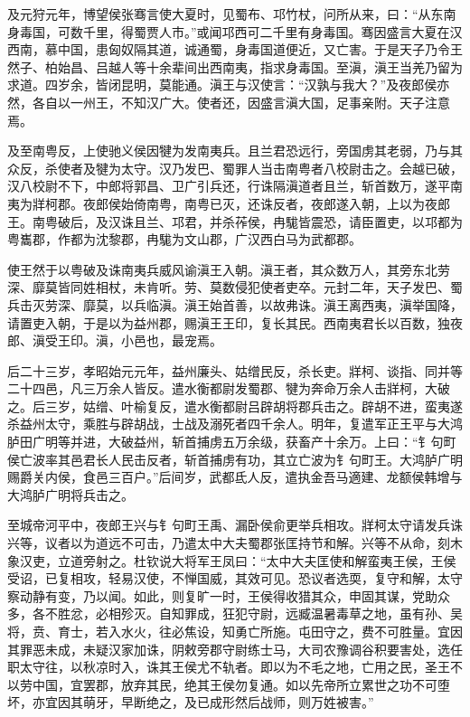 \documentclass[]{article}
\begin{document}
及元狩元年，博望侯张骞言使大夏时，见蜀布、邛竹杖，问所从来，曰：``从东南身毒国，可数千里，得蜀贾人市。''或闻邛西可二千里有身毒国。骞因盛言大夏在汉西南，慕中国，患匈奴隔其道，诚通蜀，身毒国道便近，又亡害。于是天子乃令王然子、柏始昌、吕越人等十余辈间出西南夷，指求身毒国。至滇，滇王当羌乃留为求道。四岁余，皆闭昆明，莫能通。滇王与汉使言：``汉孰与我大？''及夜郎侯亦然，各自以一州王，不知汉广大。使者还，因盛言滇大国，足事亲附。天子注意焉。

及至南粤反，上使驰义侯因犍为发南夷兵。且兰君恐远行，旁国虏其老弱，乃与其众反，杀使者及犍为太守。汉乃发巴、蜀罪人当击南粤者八校尉击之。会越已破，汉八校尉不下，中郎将郭昌、卫广引兵还，行诛隔滇道者且兰，斩首数万，遂平南夷为牂柯郡。夜郎侯始倚南粤，南粤已灭，还诛反者，夜郎遂入朝，上以为夜郎王。南粤破后，及汉诛且兰、邛君，并杀莋侯，冉駹皆震恐，请臣置吏，以邛都为粤巂郡，作都为沈黎郡，冉駹为文山郡，广汉西白马为武都郡。

使王然于以粤破及诛南夷兵威风谕滇王入朝。滇王者，其众数万人，其旁东北劳深、靡莫皆同姓相杖，未肯听。劳、莫数侵犯使者吏卒。元封二年，天子发巴、蜀兵击灭劳深、靡莫，以兵临滇。滇王始首善，以故弗诛。滇王离西夷，滇举国降，请置吏入朝，于是以为益州郡，赐滇王王印，复长其民。西南夷君长以百数，独夜郎、滇受王印。滇，小邑也，最宠焉。

后二十三岁，孝昭始元元年，益州廉头、姑缯民反，杀长吏。牂柯、谈指、同并等二十四邑，凡三万余人皆反。遣水衡都尉发蜀郡、犍为奔命万余人击牂柯，大破之。后三岁，姑缯、叶榆复反，遣水衡都尉吕辟胡将郡兵击之。辟胡不进，蛮夷遂杀益州太守，乘胜与辟胡战，士战及溺死者四千余人。明年，复遣军正王平与大鸿胪田广明等并进，大破益州，斩首捕虏五万余级，获畜产十余万。上曰：``钅句町侯亡波率其邑君长人民击反者，斩首捕虏有功，其立亡波为钅句町王。大鸿胪广明赐爵关内侯，食邑三百户。''后间岁，武都氐人反，遣执金吾马適建、龙额侯韩增与大鸿胪广明将兵击之。

至城帝河平中，夜郎王兴与钅句町王禹、漏卧侯俞更举兵相攻。牂柯太守请发兵诛兴等，议者以为道远不可击，乃遣太中大夫蜀郡张匡持节和解。兴等不从命，刻木象汉吏，立道旁射之。杜钦说大将军王凤曰：``太中大夫匡使和解蛮夷王侯，王侯受诏，已复相攻，轻易汉使，不惮国威，其效可见。恐议者选耎，复守和解，太守察动静有变，乃以闻。如此，则复旷一时，王侯得收猎其众，申固其谋，党助众多，各不胜忿，必相殄灭。自知罪成，狂犯守尉，远臧温暑毒草之地，虽有孙、吴将，贲、育士，若入水火，往必焦设，知勇亡所施。屯田守之，费不可胜量。宜因其罪恶未成，未疑汉家加诛，阴敕旁郡守尉练士马，大司农豫调谷积要害处，选任职太守往，以秋凉时入，诛其王侯尤不轨者。即以为不毛之地，亡用之民，圣王不以劳中国，宜罢郡，放弃其民，绝其王侯勿复通。如以先帝所立累世之功不可堕坏，亦宜因其萌牙，早断绝之，及已成形然后战师，则万姓被害。''
\end{document}
